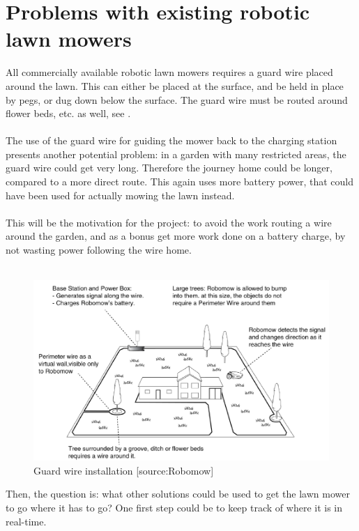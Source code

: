 \section{Problems with existing robotic lawn mowers}
All commercially available robotic lawn mowers requires a guard wire placed around the lawn. This can either be placed at the surface, and be held in place by pegs, or dug down below the surface. The guard wire must be routed around flower beds, etc. as well, see .\\\\
%
The use of the guard wire for guiding the mower back to the charging station presents another potential problem: in a garden with many restricted areas, the guard wire could get very long. Therefore the journey home could be longer, compared to a more direct route. This again uses more battery power, that could have been used for actually mowing the lawn instead.\\\\
%
This will be the motivation for the project: to avoid the work routing a wire around the garden, and as a bonus get more work done on a battery charge, by not wasting power following the wire home.\\\\

\begin{figure}[H]
\centering
\includegraphics[scale=0.6]{figures/robomow.png} 
\caption{Guard wire installation [source:Robomow]} 
\label{fig:robomow}
\end{figure}
\noindent

Then, the question is: what other solutions could be used to get the lawn mower to go where it has to go?
One first step could be to keep track of where it is in real-time.